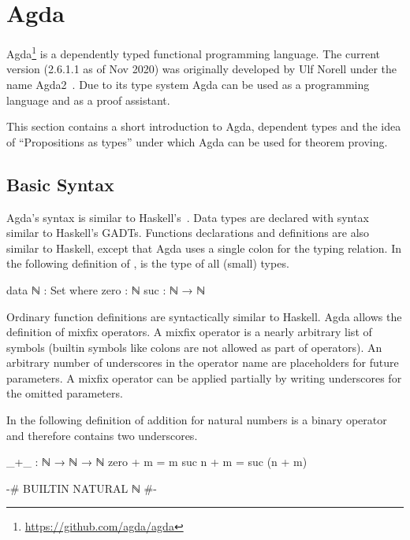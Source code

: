 
\section{Agda}

Agda\footnote{\url{https://github.com/agda/agda}} is a dependently typed
functional programming language.
The current version (2.6.1.1 as of Nov 2020) was originally developed by Ulf
Norell under the name Agda2~\cite{norell:thesis}.
Due to its type system Agda can be used as a programming language and as a proof
assistant.

This section contains a short introduction to Agda, dependent types and the idea
of ``Propositions as types'' under which Agda can be used for theorem proving.

\subsection{Basic Syntax}

Agda's syntax is similar to Haskell's~\cite{Haskell98}.
Data types are declared with syntax similar to Haskell's GADTs.
Functions declarations and definitions are also similar to Haskell, except that
Agda uses a single colon for the typing relation.
In the following definition of ,  is the type
of all (small) types.

\begin{code}
data ℕ : Set where
  zero  : ℕ
  suc   : ℕ → ℕ
\end{code}
Ordinary function definitions are syntactically similar to Haskell.
Agda allows the definition of mixfix operators.
A mixfix operator is a nearly arbitrary list of symbols (builtin symbols like
colons are not allowed as part of operators).
An arbitrary number of underscores in the operator name are placeholders for
future parameters.
A mixfix operator can be applied partially by writing underscores for the
omitted parameters.

In the following definition of addition for natural numbers \AgdaFunction{+} is
a binary operator and therefore contains two underscores.

\begin{code}
_+_ : ℕ → ℕ → ℕ
zero   + m = m
suc n  + m = suc (n + m)
\end{code}
\begin{code}[hide]
{-# BUILTIN NATURAL ℕ #-}
\end{code}

